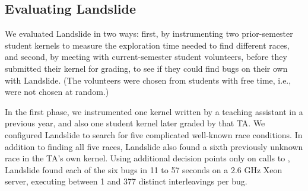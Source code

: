 %

\subsection{Evaluating Landslide}

We evaluated Landslide in two ways: first, by instrumenting two prior-semester student kernels to measure the exploration time needed to find different races, and second, by meeting with current-semester student volunteers, before they submitted their kernel for grading, to see if they could find bugs on their own with Landslide.
(The volunteers were chosen from students with free time, i.e., were not chosen at random.)

In the first phase, we instrumented one kernel written by a teaching assistant in a previous year, and also one student kernel later graded by that TA.
We configured Landslide to search for five complicated well-known race conditions.
In addition to finding all five races, Landslide also found a sixth previously unknown race in the TA's own kernel.
Using additional decision points only on calls to , Landslide found each of the six bugs in 11 to 57 seconds on a 2.6 GHz Xeon server, executing between 1 and 377 distinct interleavings per bug.

